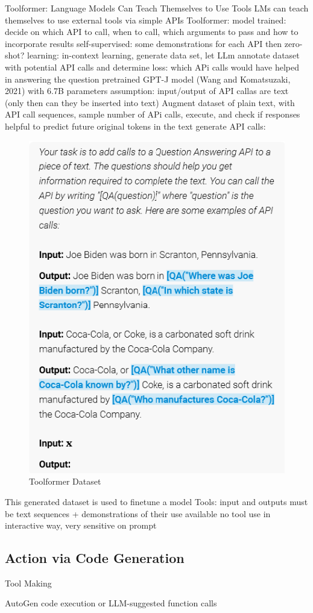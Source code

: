 \documentclass{article}
\begin{document}
\cite{schick_toolformer_2023} Toolformer: Language Models Can Teach Themselves to Use Tools
LMs can teach themselves to use external tools via simple APIs
Toolformer: model trained: decide on which API to call, when to call, which arguments to pass and how to incorporate results
self-supervised: some demonstrations for each API
then zero-shot?
learning: in-context learning, generate data set, let LLm annotate dataset with potential API calls and determine loss: which APi calls would have helped in answering the question
pretrained GPT-J model (Wang and Komatsuzaki, 2021) with 6.7B parameters
assumption: input/output of API callas are text (only then can they be inserted into text)
Augment dataset of plain text, with API call sequences, sample number of APi calls, execute, and check if responses helpful to predict future original tokens in the text
generate API calls:
\begin{figure}[h]
	\centering
	\includegraphics[width=0.5\linewidth]{ToolformerDataset.png}
	\caption{Toolformer Dataset \cite{schick_toolformer_2023}}
	\label{fig:toolformerdataset}
\end{figure}
This generated dataset is used to finetune a model
Tools: input and outputs must be text sequences + demonstrations of their use available
no tool use in interactive way, very sensitive on prompt


\subsection{Action via Code Generation}
Tool Making

\cite{wu_autogen_2023} AutoGen code execution or LLM-suggested function calls
\end{document}
